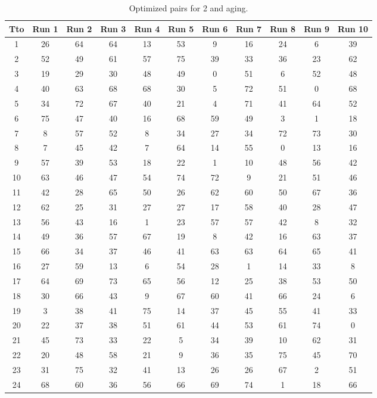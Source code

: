 \begin{table}
  \centering
  \scriptsize
  \caption{Optimized pairs for 2 and aging.}
  \label{tab_pairs}
\begin{tabular}{c c c c c c c c c c c }
\hline
Tto & Run 1 & Run 2 & Run 3 & Run 4 & Run 5 & Run 6 & Run 7 & Run 8 & Run 9 & Run 10 \\
\hline
1 & 26 & 64 & 64 & 13 & 53 & 9 & 16 & 24 & 6 & 39 \\
2 & 52 & 49 & 61 & 57 & 75 & 39 & 33 & 36 & 23 & 62 \\
3 & 19 & 29 & 30 & 48 & 49 & 0 & 51 & 6 & 52 & 48 \\
4 & 40 & 63 & 68 & 68 & 30 & 5 & 72 & 51 & 0 & 68 \\
5 & 34 & 72 & 67 & 40 & 21 & 4 & 71 & 41 & 64 & 52 \\
6 & 75 & 47 & 40 & 16 & 68 & 59 & 49 & 3 & 1 & 18 \\
7 & 8 & 57 & 52 & 8 & 34 & 27 & 34 & 72 & 73 & 30 \\
8 & 7 & 45 & 42 & 7 & 64 & 14 & 55 & 0 & 13 & 16 \\
9 & 57 & 39 & 53 & 18 & 22 & 1 & 10 & 48 & 56 & 42 \\
10 & 63 & 46 & 47 & 54 & 74 & 72 & 9 & 21 & 51 & 46 \\
11 & 42 & 28 & 65 & 50 & 26 & 62 & 60 & 50 & 67 & 36 \\
12 & 62 & 25 & 31 & 27 & 27 & 17 & 58 & 40 & 28 & 47 \\
13 & 56 & 43 & 16 & 1 & 23 & 57 & 57 & 42 & 8 & 32 \\
14 & 49 & 36 & 57 & 67 & 19 & 8 & 42 & 16 & 63 & 37 \\
15 & 66 & 34 & 37 & 46 & 41 & 63 & 63 & 64 & 65 & 41 \\
16 & 27 & 59 & 13 & 6 & 54 & 28 & 1 & 14 & 33 & 8 \\
17 & 64 & 69 & 73 & 65 & 56 & 12 & 25 & 38 & 53 & 50 \\
18 & 30 & 66 & 43 & 9 & 67 & 60 & 41 & 66 & 24 & 6 \\
19 & 3 & 38 & 41 & 75 & 14 & 37 & 45 & 55 & 41 & 33 \\
20 & 22 & 37 & 38 & 51 & 61 & 44 & 53 & 61 & 74 & 0 \\
21 & 45 & 73 & 33 & 22 & 5 & 34 & 39 & 10 & 62 & 31 \\
22 & 20 & 48 & 58 & 21 & 9 & 36 & 35 & 75 & 45 & 70 \\
23 & 31 & 75 & 32 & 41 & 13 & 26 & 26 & 67 & 2 & 51 \\
24 & 68 & 60 & 36 & 56 & 66 & 69 & 74 & 1 & 18 & 66 \\

\end{tabular}
\end{table}
